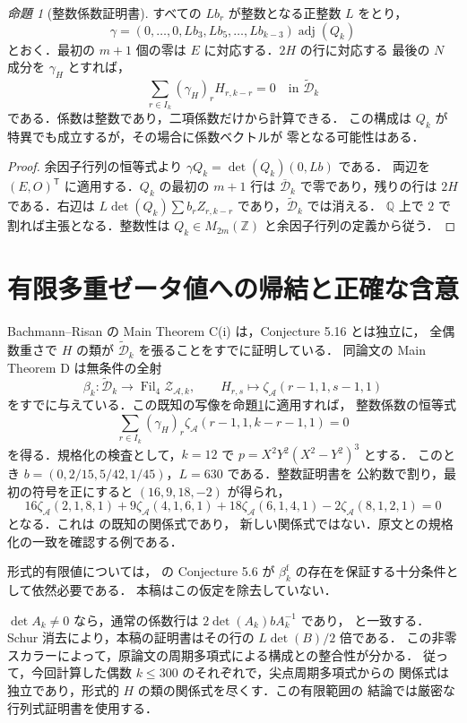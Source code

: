 \documentclass[12pt]{amsart}
\theoremstyle{definition}
\theoremstyle{remark}
\numberwithin{equation}{section}
\newcommand{\Z}{\mathbb{Z}}
\newcommand{\Q}{\mathbb{Q}}
\newcommand{\Fil}{\operatorname{Fil}}
\newcommand{\za}{\zeta_{\mathcal A}}
\newcommand{\Dbar}{\overline{\mathcal D}_k}
\newcommand{\Dtilde}{\widetilde{\mathcal D}_k}
\newcommand{\adj}{\operatorname{adj}}
\newtheorem{jprop}[thm]{命題}
\theoremstyle{definition}
\theoremstyle{remark}
\begin{document}
\begin{jprop}[整数係数証明書]\label{ja:cert}
すべての $Lb_r$ が整数となる正整数 $L$ をとり，
\[
 \gamma=(0,\ldots,0,Lb_3,Lb_5,\ldots,Lb_{k-3})\adj(Q_k)
\]
とおく．最初の $m+1$ 個の零は $E$ に対応する．$2H$ の行に対応する
最後の $N$ 成分を $\gamma_H$ とすれば，
\[
 \sum_{r\in I_k}(\gamma_H)_rH_{r,k-r}=0\quad\text{in }\Dtilde
\]
である．係数は整数であり，二項係数だけから計算できる．
この構成は $Q_k$ が特異でも成立するが，その場合に係数ベクトルが
零となる可能性はある．
\end{jprop}
\begin{proof}
余因子行列の恒等式より $\gamma Q_k=\det(Q_k)(0,Lb)$ である．
両辺を $(E,O)^{\mathsf T}$ に適用する．$Q_k$ の最初の $m+1$ 行は
$\Dbar$ で零であり，残りの行は $2H$ である．右辺は
$L\det(Q_k)\sum b_rZ_{r,k-r}$ であり，$\Dtilde$ では消える．
$\Q$ 上で $2$ で割れば主張となる．整数性は
$Q_k\in M_{2m}(\Z)$ と余因子行列の定義から従う．
\end{proof}

\section{有限多重ゼータ値への帰結と正確な含意}
Bachmann--Risan の Main Theorem C(i) は，Conjecture 5.16 とは独立に，
全偶数重さで $H$ の類が $\Dtilde$ を張ることをすでに証明している．
同論文の Main Theorem D は無条件の全射
\[
 \beta_k:\Dtilde\longrightarrow\Fil_4\mathcal Z_{\mathcal A,k},
 \qquad H_{r,s}\longmapsto\za(r-1,1,s-1,1)
\]
をすでに与えている．この既知の写像を命題\ref{ja:cert}に適用すれば，
整数係数の恒等式
\begin{equation}\label{ja:finitecert}
 \sum_{r\in I_k}(\gamma_H)_r\za(r-1,1,k-r-1,1)=0
\end{equation}
を得る．規格化の検査として，$k=12$ で $p=X^2Y^2(X^2-Y^2)^3$ とする．
このとき $b=(0,2/15,5/42,1/45)$，$L=630$ である．整数証明書を
公約数で割り，最初の符号を正にすると $(16,9,18,-2)$ が得られ，
\[
 16\za(2,1,8,1)+9\za(4,1,6,1)
 +18\za(6,1,4,1)-2\za(8,1,2,1)=0
\]
となる．これは \cite[(1.6), Example 5.18]{jBR} の既知の関係式であり，
新しい関係式ではない．原文との規格化の一致を確認する例である．

形式的有限値については，\cite{jBR} の Conjecture 5.6 が
$\beta_k^{\mathrm f}$ の存在を保証する十分条件として依然必要である．
本稿はこの仮定を除去していない．

$\det A_k\ne0$ なら，通常の係数行は
$2\det(A_k)bA_k^{-1}$ であり，\cite[Theorem 5.17]{jBR} と一致する．
Schur 消去により，本稿の証明書はその行の $L\det(B)/2$ 倍である．
この非零スカラーによって，原論文の周期多項式による構成との整合性が分かる．
従って，今回計算した偶数 $k\leq300$ のそれぞれで，尖点周期多項式からの
関係式は独立であり，形式的 $H$ の類の関係式を尽くす．この有限範囲の
結論では厳密な行列式証明書を使用する．
\end{document}
